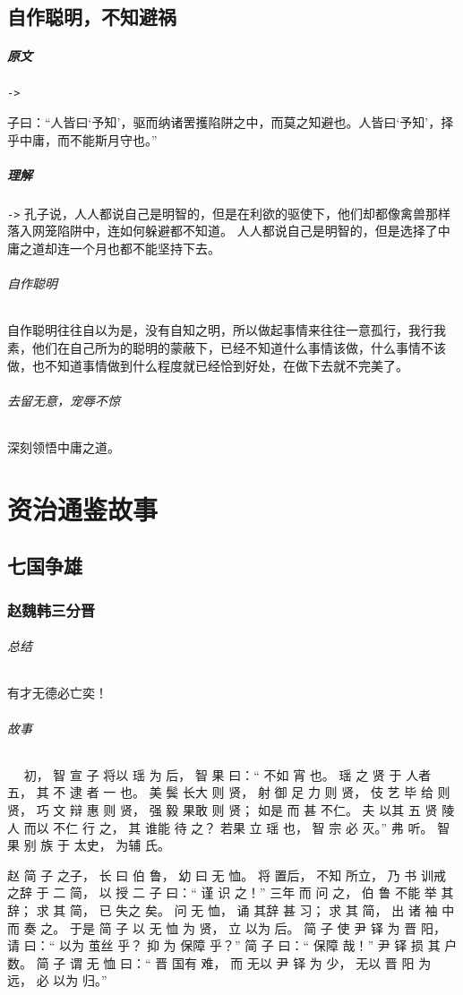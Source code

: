 \documentclass[UTF8,a4paper,8pt]{ctexbook}
\begin{document}
	\section{自作聪明，不知避祸}
			\paragraph{原文}\verb|->|
					
				子曰：“人皆曰‘予知’，驱而纳诸罟擭陷阱之中，而莫之知避也。人皆曰‘予知’，择乎中庸，而不能斯月守也。”
			\paragraph{理解}\verb|->|
				孔子说，人人都说自己是明智的，但是在利欲的驱使下，他们却都像禽兽那样落入网笼陷阱中，连如何躲避都不知道。
				人人都说自己是明智的，但是选择了中庸之道却连一个月也都不能坚持下去。
			
				
				\subparagraph{自作聪明} 自作聪明往往自以为是，没有自知之明，所以做起事情来往往一意孤行，我行我素，他们在自己所为的聪明的蒙蔽下，已经不知道什么事情该做，什么事情不该做，也不知道事情做到什么程度就已经恰到好处，在做下去就不完美了。
				
				\subparagraph{去留无意，宠辱不惊}深刻领悟中庸之道。	
\chapter{资治通鉴故事}
	\section{七国争雄}
		\subsection{赵魏韩三分晋}
			\subparagraph{总结}有才无德必亡奕！
			
			\subparagraph{故事}
				　 初， 智 宣 子 将以 瑶 为 后， 智 果 曰：“ 不如 宵 也。 瑶 之 贤 于 人者 五， 其 不 逮 者 一 也。 美 鬓 长大 则 贤， 射 御 足 力 则 贤， 伎 艺 毕 给 则 贤， 巧 文 辩 惠 则 贤， 强 毅 果敢 则 贤； 如是 而 甚 不仁。 夫 以其 五 贤 陵 人 而以 不仁 行 之， 其 谁能 待 之？ 若果 立 瑶 也， 智 宗 必 灭。” 弗 听。 智 果 别 族 于 太史， 为辅 氏。
				
				  赵 简 子 之子， 长 曰 伯 鲁， 幼 曰 无 恤。 将 置后， 不知 所立， 乃 书 训戒 之辞 于 二 简， 以 授 二 子 曰：“ 谨 识 之！” 三年 而 问 之， 伯 鲁 不能 举 其辞； 求 其 简， 已 失之 矣。 问 无 恤， 诵 其辞 甚 习； 求 其 简， 出 诸 袖 中 而 奏 之。 于是 简 子 以 无 恤 为 贤， 立 以为 后。 简 子 使 尹 铎 为 晋 阳， 请 曰：“ 以为 茧丝 乎？ 抑 为 保障 乎？” 简 子 曰：“ 保障 哉！” 尹 铎 损 其 户数。 简 子 谓 无 恤 曰：“ 晋 国有 难， 而 无以 尹 铎 为 少， 无以 晋 阳 为 远， 必 以为 归。” 
				  
\end{document}
